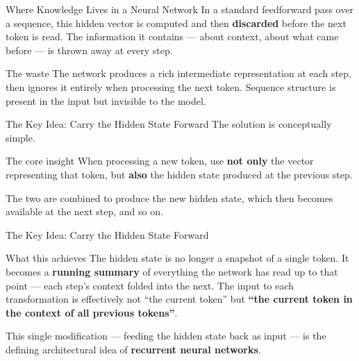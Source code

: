 \documentclass[aspectratio=169]{beamer}
\begin{document}
%
\begin{frame}{Where Knowledge Lives in a Neural Network}
\vspace{0.2cm}
In a standard feedforward pass over a sequence,
this hidden vector is computed and then \textbf{discarded}
before the next token is read.
The information it contains --- about context, about what came before ---
is thrown away at every step.

\vspace{0.15cm}
\begin{alertblock}{The waste}
The network produces a rich intermediate representation at each step,
then ignores it entirely when processing the next token.
Sequence structure is present in the input but invisible to the model.
\end{alertblock}
\end{frame}
%
%
\begin{frame}{The Key Idea: Carry the Hidden State Forward}
The solution is conceptually simple.

\vspace{0.15cm}
\begin{alertblock}{The core insight}
When processing a new token, use \textbf{not only} the vector
representing that token, but \textbf{also} the hidden state
produced at the previous step.
\end{alertblock}

\vspace{0.15cm}
The two are combined to produce the new hidden state,
which then becomes available at the next step, and so on.
\end{frame}
%
%
\begin{frame}{The Key Idea: Carry the Hidden State Forward}
\vspace{0.15cm}
\begin{block}{What this achieves}
The hidden state is no longer a snapshot of a single token.
It becomes a \textbf{running summary} of everything the network
has read up to that point --- each step's context folded into the next.
The input to each transformation is effectively not
``the current token'' but \textbf{``the current token in the context
of all previous tokens''}.
\end{block}

\vspace{0.1cm}
This single modification --- feeding the hidden state back as input ---
is the defining architectural idea of \textbf{recurrent neural networks}.
\end{frame}
\end{document}
